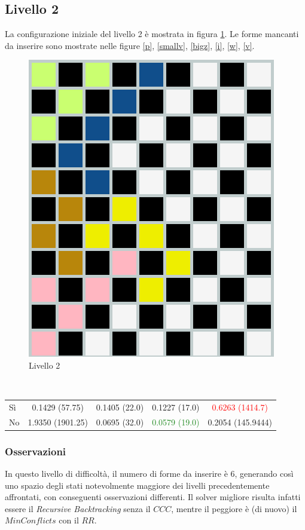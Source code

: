 \subsection{Livello 2}
La configurazione iniziale del livello 2 è mostrata in figura \ref{lev2}. Le forme mancanti da inserire sono mostrate nelle figure \ref{p}, \ref{smallv}, \ref{bigz}, \ref{i}, \ref{w}, \ref{v}.
\begin{figure}[h]
	\centering
	\includegraphics[scale=0.3]{immagini/lv2}
	\caption{Livello 2}
	\label{lev2}
\end{figure}
\\
\noindent
\begin{table} 
	\begin{tabular}{|l||*{4}{c|}}\hline 
		\backslashbox{Miglioria}{Solver} 
		&\makebox{DFS}&\makebox{Backtracking}&\makebox{Recursive Backtracking}	&\makebox{MinConflicts}\\ \hline 
		Sì&0.1429 (57.75)&0.1405 (22.0)&0.1227 (17.0)&\textcolor{red}{0.6263 (1414.7)} \\ \hline 
		No&1.9350 (1901.25)&0.0695 (32.0)&\textcolor{ForestGreen}{0.0579 (19.0)}&0.2054 (145.9444)  \\ \hline 
	\end{tabular} 
\end{table}

\subsubsection{Osservazioni}
In questo livello di difficoltà, il numero di forme da inserire è 6, generando così uno spazio degli stati notevolmente maggiore dei livelli precedentemente affrontati, con conseguenti osservazioni differenti.
Il solver migliore risulta infatti essere il \textit{Recursive Backtracking} senza il $CCC$, mentre il peggiore è (di nuovo) il $MinConflicts$ con il $RR$.\\

